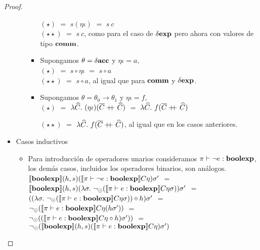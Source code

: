 \begin{proof}
\begin{itemize}
\begin{itemize}
\begin{itemize}
$(\star)$ $=$ $s(\eta\iota)$ $=$ $s \ c$\\

$(\star\star)$ $=$ $s \ c$, como para el caso de $\delta \textbf{exp}$ pero ahora con valores
de tipo $\textbf{comm}$.

\item Supongamos $\theta = \delta \textbf{acc}$ y $\eta\iota = a$,\\

$(\star)$ $=$ $s \circ \eta\iota$ $=$ $s \circ a$\\

$(\star\star)$ $=$ $s \circ a$, al igual que para $\textbf{comm}$ y $\delta \textbf{exp}$.

\item Supongamos $\theta = \theta_0 \rightarrow \theta_1$ y $\eta \iota = f$,\\

$(\star)$ $=$ $\lambda \widehat{C} . \ (\eta\iota)(\overline{C}\concat\widehat{C})$ $=$ 
$\lambda \widehat{C} . \ f(\overline{C}\concat\widehat{C})$

$(\star\star)$ $=$ $\lambda \widehat{C} . \ f(\overline{C}\concat\widehat{C})$, al igual
que en los casos anteriores.
\end{itemize}
\end{itemize}

\item Casos inductivos
\begin{itemize}
\item Para introducci\'on de operadores unarios consideramos $\pi \vdash \neg e : \textbf{boolexp}$, los
dem\'as casos, incluidos los operadores binarios, son an\'alogos.\\

$\llbracket \textbf{boolexp} \rrbracket(h,s)(\llbracket \pi \vdash \neg e : \textbf{boolexp} \rrbracket C\eta)\sigma'$ $=$\\
$\semBrcks{\boolexp}(h,s)(\lambda \sigma . \ 
 \neg_{\odot}(\semBrcks{\pi \vdash e : \boolexp}C\eta\sigma))\sigma'$ $=$\\
$((\lambda \sigma . \ \neg_{\odot}(\semBrcks{\pi \vdash e : \boolexp}C\eta\sigma))
	\circ 
	h) \sigma'$ $=$ \\
$\neg_{\odot}(\llbracket \pi \vdash e : \textbf{boolexp} \rrbracket C\eta(h\sigma'))$ $=$\\
$\neg_{\odot}
	((\llbracket \pi \vdash e : \textbf{boolexp} \rrbracket C\eta \circ h)\sigma'))$ $=$\\
$\neg_{\odot}
	(\llbracket \textbf{boolexp} \rrbracket(h,s)(\llbracket \pi \vdash e : \textbf{boolexp} \rrbracket C\eta)\sigma')$\\
	

\end{itemize}
\end{itemize}
\end{proof}
